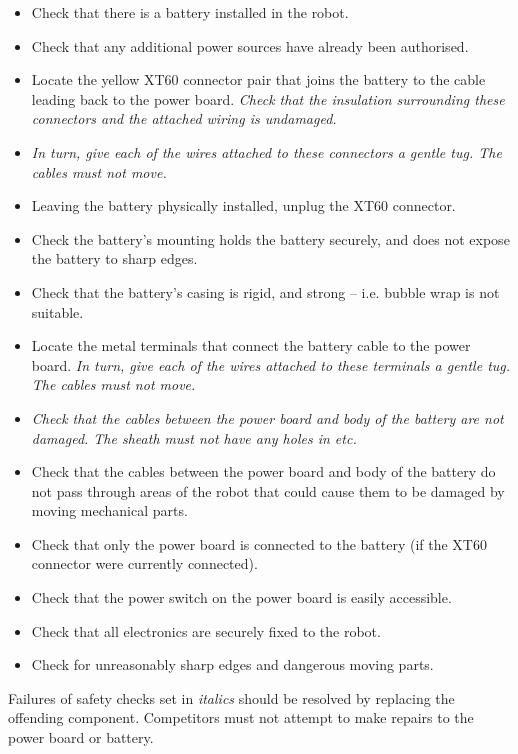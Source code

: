 \begin{itemize}
\item Check that there is a battery installed in the robot.
\item Check that any additional power sources have already been authorised.
\item Locate the yellow XT60 connector pair that joins the battery to the cable leading back to the power board. \textit{Check that the insulation surrounding these connectors and the attached wiring is undamaged.}
\item \textit{In turn, give each of the wires attached to these connectors a gentle tug. The cables must not move.}
\item Leaving the battery physically installed, unplug the XT60 connector.
\item Check the battery's mounting holds the battery securely, and does not expose the battery to sharp edges.
\item Check that the battery's casing is rigid, and strong -- i.e. bubble wrap is not suitable.
\item Locate the metal terminals that connect the battery cable to the power board. \textit{In turn, give each of the wires attached to these terminals a gentle tug. The cables must not move.}
\item \textit{Check that the cables between the power board and body of the battery are not damaged. The sheath must not have any holes in etc.}
\item Check that the cables between the power board and body of the battery do not pass through areas of the robot that could cause them to be damaged by moving mechanical parts.
\item Check that only the power board is connected to the battery (if the XT60 connector were currently connected).
\item Check that the power switch on the power board is easily accessible.
\item Check that all electronics are securely fixed to the robot.
\item Check for unreasonably sharp edges and dangerous moving parts.
\end{itemize}

Failures of safety checks set in \textit{italics} should be resolved by replacing the offending component. Competitors must not attempt to make repairs to the power board or battery.
